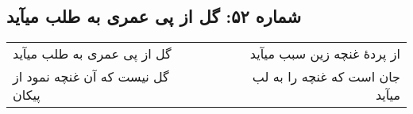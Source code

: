 \begin{center}
\section*{شماره ۵۲: گل از پی عمری به طلب میآید}
\label{sec:052}
\begin{longtable}{l p{0.5cm} r}
گل از پی عمری به طلب میآید
&&
از پردهٔ غنچه زین سبب میآید
\\
گل نیست که آن غنچه نمود از پیکان
&&
جان است که غنچه را به لب میآید
\\
\end{longtable}
\end{center}
